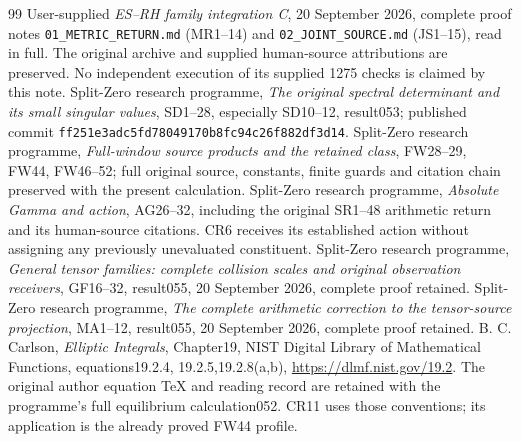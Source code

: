 \documentclass[11pt]{article}
\begin{document}
\begin{thebibliography}{99}
 User-supplied \emph{ES--RH family integration C},
20 September 2026, complete proof notes \texttt{01\_METRIC\_RETURN.md}
(MR1--14) and \texttt{02\_JOINT\_SOURCE.md} (JS1--15), read in full.
The original archive and supplied human-source attributions are
preserved. No independent execution of its supplied 1275 checks is
claimed by this note.
 Split-Zero research programme, \emph{The original spectral
determinant and its small singular values}, SD1--28, especially
SD10--12, result053; published commit
\nolinkurl{ff251e3adc5fd78049170b8fc94c26f882df3d14}.
 Split-Zero research programme, \emph{Full-window source
products and the retained class}, FW28--29, FW44, FW46--52;
full original source, constants, finite guards and citation chain
preserved with the present calculation.
 Split-Zero research programme, \emph{Absolute Gamma and
action}, AG26--32, including the original SR1--48 arithmetic return
and its human-source citations. CR6 receives its established action
without assigning any previously unevaluated constituent.
 Split-Zero research programme, \emph{General tensor
families: complete collision scales and original observation receivers},
GF16--32, result055, 20 September 2026, complete proof retained.
 Split-Zero research programme, \emph{The complete arithmetic
correction to the tensor-source projection}, MA1--12, result055,
20 September 2026, complete proof retained.
 B. C. Carlson, \emph{Elliptic Integrals}, Chapter19,
NIST Digital Library of Mathematical Functions, equations19.2.4,
19.2.5,19.2.8(a,b), \url{https://dlmf.nist.gov/19.2}.
The original author equation TeX and reading record are retained
with the programme's full equilibrium calculation052. CR11 uses
those conventions; its application is the already proved FW44 profile.

\end{thebibliography}
\end{document}
